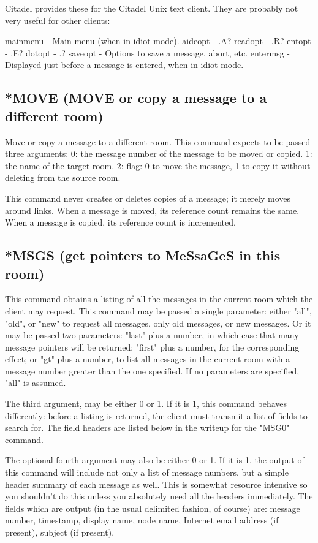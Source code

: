  Citadel provides these for the Citadel Unix text client.  They are
probably not very useful for other clients:

 mainmenu     -  Main menu (when in idiot mode).
 aideopt      -  .A?
 readopt      -  .R?
 entopt       -  .E?
 dotopt       -  .?
 saveopt      -  Options to save a message, abort, etc.
 entermsg     -  Displayed just before a message is entered, when in
                 idiot mode.



\subsection{*MOVE (MOVE or copy a message to a different room)}

 Move or copy a message to a different room.  This command expects to be
passed three arguments:
 0: the message number of the message to be moved or copied.
 1: the name of the target room.
 2: flag: 0 to move the message, 1 to copy it without deleting from the
    source room.

 This command never creates or deletes copies of a message; it merely moves
around links.  When a message is moved, its reference count remains the same.
When a message is copied, its reference count is incremented.




\subsection{*MSGS (get pointers to MeSsaGeS in this room)}

 This command obtains a listing of all the messages in the current room
which the client may request.  This command may be passed a single parameter:
either "all", "old", or "new" to request all messages, only old messages, or
new messages.  Or it may be passed two parameters: "last" plus a number, in
which case that many message pointers will be returned; "first" plus a
number, for the corresponding effect; or "gt" plus a number, to list all
messages in the current room with a message number greater than the one
specified.  If no parameters are specified, "all" is assumed.

 The third argument, may be either 0 or 1.  If it is 1, this command behaves
differently: before a listing is returned, the client must transmit a list
of fields to search for.  The field headers are listed below in the writeup
for the "MSG0" command.

 The optional fourth argument may also be either 0 or 1.  If it is 1, the
output of this command will include not only a list of message numbers, but
a simple header summary of each message as well.  This is somewhat resource
intensive so you shouldn't do this unless you absolutely need all the headers
immediately.  The fields which are output (in the usual delimited fashion, of
course) are: message number, timestamp, display name, node name, Internet
email address (if present), subject (if present).

